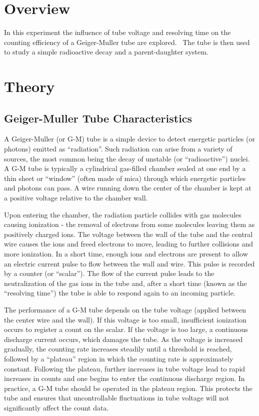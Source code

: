\section{Overview}

In this experiment the influence of tube voltage and resolving time on
the counting efficiency of a Geiger-Muller tube are explored. \ The
tube is then used to study a simple radioactive decay and a
parent-daughter system.

\section{Theory}

\subsection{Geiger-Muller Tube Characteristics}
\label{sec:GMtubes}

A Geiger-Muller (or G-M) tube is a simple device to detect energetic
particles (or photons) emitted as
``radiation''.  Such radiation can arise
from a variety of sources, the most common being the decay of unstable
(or ``radioactive'') nuclei. A G-M tube is
typically a cylindrical gas-filled chamber sealed at one end by a thin
sheet or ``window'' (often made of mica)
through which energetic particles and photons can pass. A wire running
down the center of the chamber is kept at a positive voltage relative
to the chamber wall.

Upon entering the chamber, the radiation particle collides with gas
molecules causing ionization - the removal of electrons from some
molecules leaving them as positively charged ions.  The voltage
between the wall of the tube and the central wire causes the ions and
freed electrons to move, leading to further collisions and more
ionization.  In a short time, enough ions and electrons are present to
allow an electric current pulse to flow between the wall and wire.
 This pulse is recorded by a counter (or
``scalar''). The flow of the current pulse
leads to the neutralization of the
gas ions in the tube and, after a short time (known as the
``resolving time'') the tube is able to
respond again to an incoming particle.

The performance of a G-M tube depends on the tube voltage (applied
between the center wire and the wall).  If this voltage is too small,
insufficient ionization occurs to register a count on the scalar.  If
the voltage is too large, a continuous discharge current occurs, which
damages the tube.  As the voltage is increased gradually, the counting
rate increases steadily until a threshold is reached, followed by a
``plateau'' region in which the counting rate
is approximately constant.  Following the
plateau, further increases in tube voltage lead to rapid increases in
counts and one begins to enter the continuous discharge region.  In
practice, a G-M tube should be operated in the plateau region.  This
protects the tube and ensures that uncontrollable fluctuations in tube
voltage will not significantly affect the count data.


